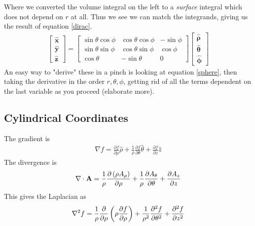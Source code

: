 Where we converted the volume integral on the left to a \emph{surface} integral which does not depend on $r$ at all. Thus we see we can match the integrands, giving us the result of equation \ref{dirac}.
\begin{align}
\begin{bmatrix}\mathbf{\hat x} \\ \mathbf{\hat y}  \\ \mathbf{\hat z} \end{bmatrix}
  = \begin{bmatrix} \sin\theta\cos\phi & \cos\theta\cos\phi & -\sin\phi \\
                    \sin\theta\sin\phi & \cos\theta\sin\phi &  \cos\phi \\
                    \cos\theta         & -\sin\theta        & 0 \end{bmatrix}
    \begin{bmatrix} \boldsymbol{\hat\rho} \\ \boldsymbol{\hat\theta} \\ \boldsymbol{\hat\phi} \end{bmatrix}
\end{align}
An easy way to "derive" these in a pinch is looking at equation \ref{sphere}, then taking the derivative in the order $r,\theta,\phi$, getting rid of all the terms dependent on the last variable as you proceed (elaborate more).


\subsection{Cylindrical Coordinates}
The gradient is
\begin{align}
\nabla f = \frac{\partial f}{\partial \rho}\hat{\rho} + \frac{1}{\rho}\frac{\partial f}{\partial \theta}\hat{\theta} + \frac{\partial f}{\partial z}\hat{z}
\end{align}
The divergence is
\begin{align}
\nabla\cdot\textbf{A} = {1 \over \rho}{\partial \left( \rho A_\rho  \right) \over \partial \rho}
+ {1 \over \rho}{\partial A_\theta \over \partial \theta}
+ {\partial A_z \over \partial z}
\end{align}
This gives the Laplacian as
\begin{align}
\nabla^2 f = {1 \over \rho}{\partial \over \partial \rho}\left(\rho {\partial f \over \partial \rho}\right)
+ {1 \over \rho^2}{\partial^2 f \over \partial \theta^2}
+ {\partial^2 f \over \partial z^2}
\end{align}


